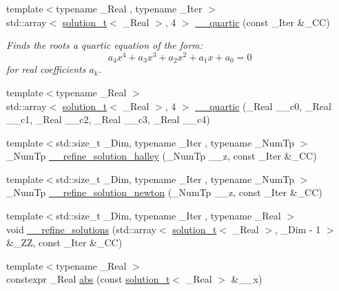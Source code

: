 \begin{DoxyCompactItemize}
\item 
{\footnotesize template$<$typename \+\_\+\+Real , typename \+\_\+\+Iter $>$ }\\std\+::array$<$ \hyperlink{namespace____gnu__cxx_ae20ea642de50eb361074c62676b0159c}{solution\+\_\+t}$<$ \+\_\+\+Real $>$, 4 $>$ \hyperlink{namespace____gnu__cxx_ac813fbad739bf1d431845d5175f24701}{\+\_\+\+\_\+quartic} (const \+\_\+\+Iter \&\+\_\+\+CC)
\begin{DoxyCompactList}\small\item\em Finds the roots a quartic equation of the form\+: \[ a_4 x^4 + a_3 x^3 + a_2 x^2 + a_1 x + a_0 = 0 \] for real coefficients $ a_k $. \end{DoxyCompactList}\item 
{\footnotesize template$<$typename \+\_\+\+Real $>$ }\\std\+::array$<$ \hyperlink{namespace____gnu__cxx_ae20ea642de50eb361074c62676b0159c}{solution\+\_\+t}$<$ \+\_\+\+Real $>$, 4 $>$ \hyperlink{namespace____gnu__cxx_a6dbbccdfca9b8a8dffdf99432986f0c9}{\+\_\+\+\_\+quartic} (\+\_\+\+Real \+\_\+\+\_\+c0, \+\_\+\+Real \+\_\+\+\_\+c1, \+\_\+\+Real \+\_\+\+\_\+c2, \+\_\+\+Real \+\_\+\+\_\+c3, \+\_\+\+Real \+\_\+\+\_\+c4)
\item 
{\footnotesize template$<$std\+::size\+\_\+t \+\_\+\+Dim, typename \+\_\+\+Iter , typename \+\_\+\+Num\+Tp $>$ }\\\+\_\+\+Num\+Tp \hyperlink{namespace____gnu__cxx_a957b92036746a66f3dff0c46cb18120b}{\+\_\+\+\_\+refine\+\_\+solution\+\_\+halley} (\+\_\+\+Num\+Tp \+\_\+\+\_\+z, const \+\_\+\+Iter \&\+\_\+\+CC)
\item 
{\footnotesize template$<$std\+::size\+\_\+t \+\_\+\+Dim, typename \+\_\+\+Iter , typename \+\_\+\+Num\+Tp $>$ }\\\+\_\+\+Num\+Tp \hyperlink{namespace____gnu__cxx_a2b802e73df33cafb7f95800cbca6ff30}{\+\_\+\+\_\+refine\+\_\+solution\+\_\+newton} (\+\_\+\+Num\+Tp \+\_\+\+\_\+z, const \+\_\+\+Iter \&\+\_\+\+CC)
\item 
{\footnotesize template$<$std\+::size\+\_\+t \+\_\+\+Dim, typename \+\_\+\+Iter , typename \+\_\+\+Real $>$ }\\void \hyperlink{namespace____gnu__cxx_aa8dd4c7542667cc5a8e435ca53d6fad7}{\+\_\+\+\_\+refine\+\_\+solutions} (std\+::array$<$ \hyperlink{namespace____gnu__cxx_ae20ea642de50eb361074c62676b0159c}{solution\+\_\+t}$<$ \+\_\+\+Real $>$, \+\_\+\+Dim -\/ 1 $>$ \&\+\_\+\+ZZ, const \+\_\+\+Iter \&\+\_\+\+CC)
\item 
{\footnotesize template$<$typename \+\_\+\+Real $>$ }\\constexpr \+\_\+\+Real \hyperlink{namespace____gnu__cxx_ab9eb9db3560f504f8cd25a71bcb6ead5}{abs} (const \hyperlink{namespace____gnu__cxx_ae20ea642de50eb361074c62676b0159c}{solution\+\_\+t}$<$ \+\_\+\+Real $>$ \&\+\_\+\+\_\+x)

\end{DoxyCompactItemize}
